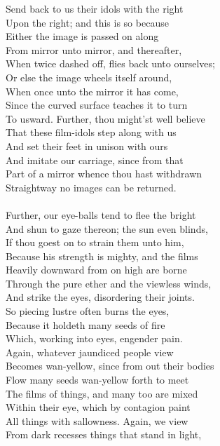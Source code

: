 Send back to us their idols with the right\\
Upon the right; and this is so because\\
Either the image is passed on along\\
From mirror unto mirror, and thereafter,\\
When twice dashed off, flies back unto ourselves;\\
Or else the image wheels itself around,\\
When once unto the mirror it has come,\\
Since the curved surface teaches it to turn\\
To usward. Further, thou might'st well believe\\
That these film-idols step along with us\\
And set their feet in unison with ours\\
And imitate our carriage, since from that\\
Part of a mirror whence thou hast withdrawn\\
Straightway no images can be returned.\\
\\
Further, our eye-balls tend to flee the bright\\
And shun to gaze thereon; the sun even blinds,\\
If thou goest on to strain them unto him,\\
Because his strength is mighty, and the films\\
Heavily downward from on high are borne\\
Through the pure ether and the viewless winds,\\
And strike the eyes, disordering their joints.\\
So piecing lustre often burns the eyes,\\
Because it holdeth many seeds of fire\\
Which, working into eyes, engender pain.\\
Again, whatever jaundiced people view\\
Becomes wan-yellow, since from out their bodies\\
Flow many seeds wan-yellow forth to meet\\
The films of things, and many too are mixed\\
Within their eye, which by contagion paint\\
All things with sallowness. Again, we view\\
From dark recesses things that stand in light,\\
